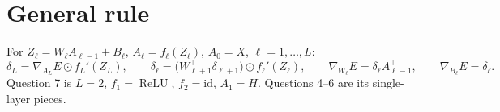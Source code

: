 \documentclass[11pt,a4paper]{article}
\newcommand{\relu}{\operatorname{ReLU}}
\newcommand{\C}[1]{{\color{chg}#1}}          %
\begin{document}
\section{\C{General rule}}
{\color{chg}
For $Z_\ell=W_\ell A_{\ell-1}+B_\ell$, $A_\ell=f_\ell(Z_\ell)$, $A_0=X$, $\ell=1,\dots,L$:
\[
\delta_L=\nabla_{A_L}E\odot f_L'(Z_L),\qquad
\delta_\ell=\bigl(W_{\ell+1}^{\top}\delta_{\ell+1}\bigr)\odot f_\ell'(Z_\ell),\qquad
\nabla_{W_\ell}E=\delta_\ell A_{\ell-1}^{\top},\qquad \nabla_{B_\ell}E=\delta_\ell .
\]
Question 7 is $L=2$, $f_1=\relu$, $f_2=\mathrm{id}$, $A_1=H$. Questions 4--6 are its single-layer pieces.
}
\end{document}
